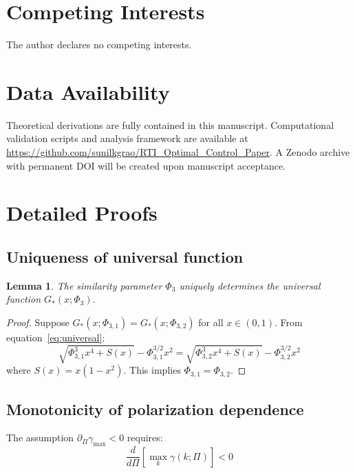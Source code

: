 \documentclass[aps,pre,twocolumn,showpacs,superscriptaddress]{revtex4-2}
\newtheorem{lemma}[theorem]{Lemma}
\theoremstyle{definition}
\begin{document}
\section*{Competing Interests}
The author declares no competing interests.

\section*{Data Availability}
Theoretical derivations are fully contained in this manuscript. Computational validation scripts and analysis framework are available at \url{https://github.com/sunilkgrao/RTI_Optimal_Control_Paper}. A Zenodo archive with permanent DOI will be created upon manuscript acceptance.

\appendix

\section{Detailed Proofs}

\subsection{Uniqueness of universal function}

\begin{lemma}
The similarity parameter $\Phi_3$ uniquely determines the universal function $G_*(x;\Phi_3)$.
\end{lemma}

\begin{proof}
Suppose $G_*(x;\Phi_{3,1}) = G_*(x;\Phi_{3,2})$ for all $x \in (0,1)$. From equation~\eqref{eq:universal}:
\begin{equation}
\sqrt{\Phi_{3,1}^3 x^4 + S(x)} - \Phi_{3,1}^{3/2} x^2 = \sqrt{\Phi_{3,2}^3 x^4 + S(x)} - \Phi_{3,2}^{3/2} x^2
\end{equation}
where $S(x) = x(1-x^2)$. This implies $\Phi_{3,1} = \Phi_{3,2}$.
\end{proof}

\subsection{Monotonicity of polarization dependence}

The assumption $\partial_\Pi\gamma_{\max} < 0$ requires:
\begin{equation}
\frac{d}{d\Pi}\left[\max_k \gamma(k;\Pi)\right] < 0
\end{equation}
\end{document}
